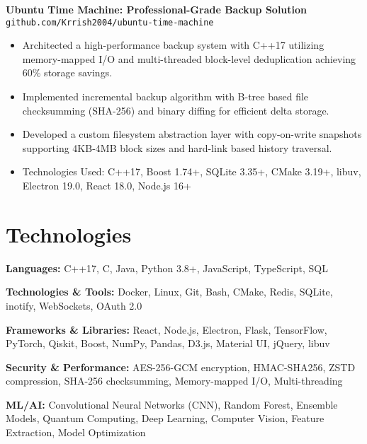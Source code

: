 \documentclass[11pt,a4paper]{article}
\newcommand{\entrytitle}[1]{\textbf{#1}}
\begin{document}
\entrytitle{Ubuntu Time Machine: Professional-Grade Backup Solution} \hfill \texttt{github.com/Krrish2004/ubuntu-time-machine}
\begin{itemize}[leftmargin=*, nosep]
    \item Architected a high-performance backup system with C++17 utilizing memory-mapped I/O and multi-threaded block-level deduplication achieving 60\% storage savings.
    \item Implemented incremental backup algorithm with B-tree based file checksumming (SHA-256) and binary diffing for efficient delta storage.
    \item Developed a custom filesystem abstraction layer with copy-on-write snapshots supporting 4KB-4MB block sizes and hard-link based history traversal.
    \item Technologies Used: C++17, Boost 1.74+, SQLite 3.35+, CMake 3.19+, libuv, Electron 19.0, React 18.0, Node.js 16+
\end{itemize}

\section{Technologies}

\textbf{Languages:} C++17, C, Java, Python 3.8+, JavaScript, TypeScript, SQL

\textbf{Technologies \& Tools:} Docker, Linux, Git, Bash, CMake, Redis, SQLite, inotify, WebSockets, OAuth 2.0

\textbf{Frameworks \& Libraries:} React, Node.js, Electron, Flask, TensorFlow, PyTorch, Qiskit, Boost, NumPy, Pandas, D3.js, Material UI, jQuery, libuv

\textbf{Security \& Performance:} AES-256-GCM encryption, HMAC-SHA256, ZSTD compression, SHA-256 checksumming, Memory-mapped I/O, Multi-threading

\textbf{ML/AI:} Convolutional Neural Networks (CNN), Random Forest, Ensemble Models, Quantum Computing, Deep Learning, Computer Vision, Feature Extraction, Model Optimization
\end{document}
